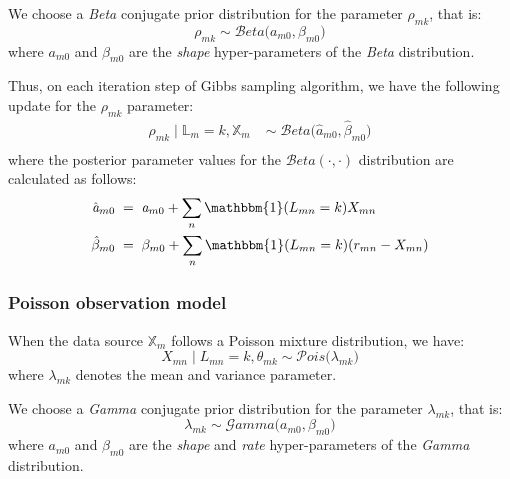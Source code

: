 We choose a \emph{Beta} conjugate prior distribution for the parameter $\rho_{mk}$, that is:
\begin{equation}
	\rho_{mk} \sim \mathcal{B}eta\big(\mathit{a}_{m0}, \beta_{m0}\big)
\end{equation}
where $\mathit{a}_{m0}$ and $\beta_{m0}$ are the \emph{shape} hyper-parameters of the \emph{Beta} distribution.

Thus, on each iteration step of Gibbs sampling algorithm, we have the following update for the $\rho_{mk}$ parameter:
\begin{equation}
  \begin{aligned}
  	\rho_{mk} \mid \mathbb{L}_{m}=k, \mathbb{X}_{m} \;& \sim \;\mathcal{B}eta\big(\hat{\mathit{a}}_{m0}, \hat{\beta}_{m0}\big) \\
  \end{aligned}
\end{equation}
where the posterior parameter values for the $\mathcal{B}eta(\cdot,\cdot)$ distribution are calculated as follows:
\begin{equation}
  \begin{aligned}
  	\hat{\mathit{a}}_{m0} \; &= \; \mathit{a}_{m0} + \sum_{n}\mathbbm{1}(L_{mn}=k)X_{mn} \\
  	\hat{\beta}_{m0} \; &= \; \beta_{m0} +  \sum_{n}\mathbbm{1}(L_{mn}=k)(r_{mn} - X_{mn})
  \end{aligned}
\end{equation}

\subsubsection*{Poisson observation model}
When the data source $\mathbb{X}_{m}$ follows a Poisson mixture distribution, we have:
\begin{equation}
	X_{mn} \mid L_{mn} = k, \theta_{mk} \sim \mathcal{P}ois\big(\lambda_{mk}\big)
\end{equation}
where $\lambda_{mk}$ denotes the mean and variance parameter.

We choose a \emph{Gamma} conjugate prior distribution for the parameter $\lambda_{mk}$, that is:
\begin{equation}
	\lambda_{mk} \sim \mathcal{G}amma\big(\mathit{a}_{m0}, \beta_{m0}\big)
\end{equation}
where $\mathit{a}_{m0}$ and $\beta_{m0}$ are the \emph{shape} and \emph{rate} hyper-parameters of the \emph{Gamma} distribution.


